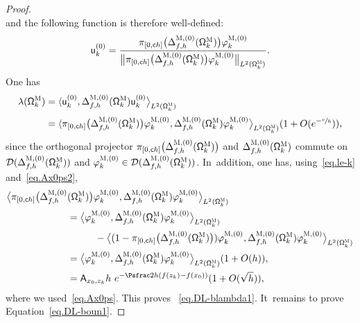\begin{proof}
\begin{equation}
\end{equation}
and the following function is therefore well-defined:
\begin{equation}
\label{eq.QMK0=}
\mathsf u^{(0)}_k= \frac{ \pi_{[0,\mathsf ch ]}\bigl(\Delta_{f,h}^{\textsc{M},(0)} (\mathsf \Omega_k^{\textsc{M}})\bigr) \varphi^{\textsc{M},(0)}_k}{ \bigl\Vert\pi_{[0,\mathsf ch ]}\bigl(\Delta_{f,h}^{\textsc{M},(0)} (\mathsf \Omega_k^{\textsc{M}})\bigr) \varphi^{\textsc{M},(0)}_k \bigr\Vert_{L^2(\mathsf \Omega_k^{\textsc{M}})} }.
\end{equation}
One has
\begin{align}
\label{eq.lambdak-O=}
\lambda(\mathsf \Omega_k^{\textsc{M}})&= \langle \mathsf u^{(0)}_k, \Delta_{f,h}^{\textsc{M},(0)} (\mathsf \Omega_k^{\textsc{M}}) \mathsf u^{(0)}_k \big \rangle_{ L^2(\mathsf \Omega_k^{\textsc{M}})}\notag\\[-4pt]
\\[-10pt]
\nonumber
&= \langle \pi_{[0,\mathsf ch ]}\bigl(\Delta_{f,h}^{\textsc{M},(0)} (\mathsf \Omega_k^{\textsc{M}})\bigr) \varphi^{\textsc{M},(0)}_k, \Delta_{f,h}^{\textsc{M},(0)} (\mathsf \Omega_k^{\textsc{M}}) \varphi^{\textsc{M},(0)}_k \big \rangle_{ L^2(\mathsf \Omega_k^{\textsc{M}})} (1+O(e^{-\sfrac ch})),
\end{align}
since the orthogonal projector $\pi_{[0,\mathsf ch ]}\bigl(\Delta_{f,h}^{\textsc{M},(0)} (\mathsf \Omega_k^{\textsc{M}})\bigr) $ and $\Delta_{f,h}^{\textsc{M},(0)} (\mathsf \Omega_k^{\textsc{M}})$ commute on $\mathcal D(\Delta_{f,h}^{\textsc{M},(0)} (\mathsf \Omega_k^{\textsc{M}}))$ and $\varphi^{\textsc{M},(0)}_k \in \mathcal D(\Delta_{f,h}^{\textsc{M}, (0)}(\mathsf \Omega_k^{\textsc{M}}))$. In~addition, one has, using~\eqref{eq.le-k} and~\eqref{eq.Ax0ps2},
\begin{align*}
\bigl\langle \pi_{[0,\mathsf ch ]}\bigl(\Delta_{f,h}^{\textsc{M},(0)}& (\mathsf \Omega_k^{\textsc{M}})\bigr) \varphi^{\textsc{M},(0)}_k, \Delta_{f,h}^{\textsc{M},(0)} (\mathsf \Omega_k^{\textsc{M}}) \varphi^{\textsc{M},(0)}_k \bigr \rangle_{ L^2(\mathsf \Omega_k^{\textsc{M}})} \\
&= \bigl\langle \varphi^{\textsc{M},(0)}_k,
\Delta_{f,h}^{\textsc{M},(0)} (\mathsf \Omega_k^{\textsc{M}}) \varphi^{\textsc{M},(0)}_k \bigr \rangle_{ L^2(\mathsf \Omega_k^{\textsc{M}})} \\
& \hspace*{1cm} - \bigl\langle (1-\pi_{[0,\mathsf ch ]}\bigl(\Delta_{f,h}^{\textsc{M},(0)} (\mathsf \Omega_k^{\textsc{M}})\bigr)) \varphi^{\textsc{M},(0)}_k, \Delta_{f,h}^{\textsc{M},(0)} (\mathsf \Omega_k^{\textsc{M}}) \varphi^{\textsc{M},(0)}_k \bigr \rangle_{ L^2(\mathsf \Omega_k^{\textsc{M}})}\\
&=\bigl\langle \varphi^{\textsc{M},(0)}_k, \Delta_{f,h}^{\textsc{M},(0)} (\mathsf \Omega_k^{\textsc{M}}) \varphi^{\textsc{M},(0)}_k \big \rangle_{ L^2(\mathsf \Omega_k^{\textsc{M}})} (1+O(h)),\\
&= \mathsf A_{x_0,z_k} h \ e^{-\Psfrac 2h (f(z_k)-f(x_0))} (1+O(\sqrt h)),
\end{align*}
where we used~\eqref{eq.Ax0ps}. This proves
~\eqref{eq.DL-blambda1}. It~remains to prove Equation~\eqref{eq.DL-boun1}.


\end{proof}
